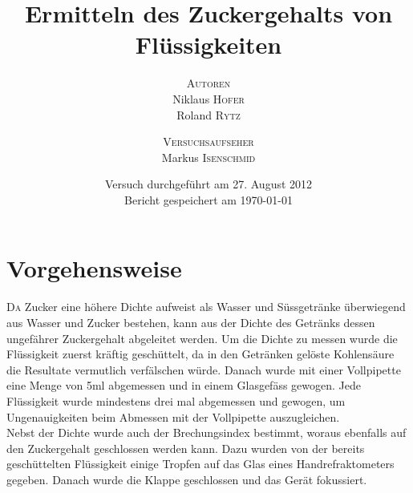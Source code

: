 \documentclass[a4paper]{article}
\title{
	\vspace{10mm}
	\fontsize{24pt}{10pt}
	\selectfont\textbf{
		Ermitteln des Zuckergehalts von Flüssigkeiten
	}\\[20mm]
}
\author{
	\Large{\textsc{Autoren}} \\[2mm] Niklaus \textsc{Hofer} \\[2mm] Roland \textsc{Rytz}
	\and
	\Large{\textsc{Versuchsaufseher}} \\[2mm]  Markus \textsc{Isenschmid} \\[120mm]
}
\date{Versuch durchgeführt am 27. August 2012 \\[2mm]
Bericht gespeichert am \today}
\begin{document}
\maketitle
\newpage

\thispagestyle{fancy} %


\begin{abstract}
\vspace{-2mm}

\end{abstract}



\section{Vorgehensweise}
\lettrine[findent=0.25em,nindent=-0em,slope=0mm,lines=2]{D}  a Zucker eine höhere Dichte aufweist als Wasser und Süssgetränke überwiegend aus Wasser und Zucker bestehen, kann aus der Dichte des Getränks dessen ungefährer Zuckergehalt abgeleitet werden. Um die Dichte zu messen wurde die Flüssigkeit zuerst kräftig geschüttelt, da in den Getränken gelöste Kohlensäure die Resultate vermutlich verfälschen würde. Danach wurde mit einer Vollpipette eine Menge von 5ml abgemessen und in einem Glasgefäss gewogen. Jede Flüssigkeit wurde mindestens drei mal abgemessen und gewogen, um Ungenauigkeiten beim Abmessen mit der Vollpipette auszugleichen.\\
Nebst der Dichte wurde auch der Brechungsindex bestimmt, woraus ebenfalls auf den Zuckergehalt geschlossen werden kann. Dazu wurden von der bereits geschüttelten Flüssigkeit einige Tropfen auf das Glas eines Handrefraktometers gegeben. Danach wurde die Klappe geschlossen und das Gerät fokussiert.
\end{document}
